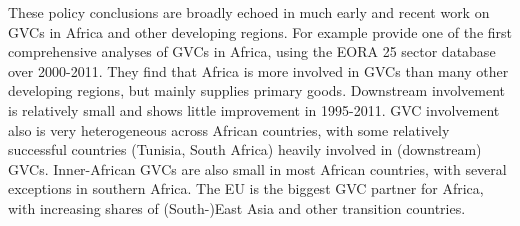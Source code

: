\documentclass[a4paper]{article}
\begin{document}
These policy conclusions are broadly echoed in much early and recent work on GVCs in Africa and other developing regions. For example \citet{foster2015global} provide one of the first comprehensive analyses of GVCs in Africa, using the EORA 25 sector database over 2000-2011. They find that Africa is more involved in GVCs than many other developing regions, but mainly supplies primary goods. Downstream involvement is relatively small and shows little improvement in 1995-2011. GVC involvement also is very heterogeneous across African countries, with some relatively successful countries (Tunisia, South Africa) heavily involved in (downstream) GVCs. %
Inner-African GVCs are also small in most African countries, with several exceptions in southern Africa. The EU is the biggest GVC partner for Africa, with increasing shares of (South-)East Asia and other transition countries. \newline
\end{document}
